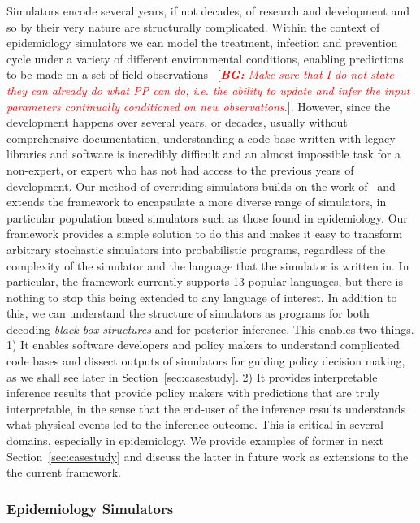 \documentclass{article}
\newcommand{\bg}[1]{~{{[{\it \textcolor{red}{{\bf BG:} #1}}]}}}
\begin{document}
Simulators encode several years, if not decades, of research and development and so by their very nature are structurally complicated. 
Within the context of epidemiology simulators we can model the treatment, infection and prevention cycle under a variety of different environmental conditions, enabling predictions to be made on a set of field observations \bg{Make sure that I do not state they can already do what PP can do, i.e. the ability to update and infer the input parameters continually conditioned on new observations.}.
However, since the development happens over several years, or decades, usually without comprehensive documentation, understanding a code base written with legacy libraries and software is incredibly difficult and an almost impossible task for a non-expert, or expert who has not had access to the previous years of development. 
Our method of overriding simulators builds on the work of~\cite{baydin2018efficient} and extends the framework to encapsulate a more diverse range of simulators, in particular population based simulators such as those found in epidemiology.
Our framework provides a simple solution to do this and makes it easy to transform arbitrary stochastic simulators into probabilistic programs, regardless of the complexity of the simulator and the language that the simulator is written in. 
In particular, the framework currently supports 13 popular languages, but there is nothing to stop this being extended to any language of interest. 
In addition to this, we can understand the structure of simulators as programs for both decoding \emph{black-box structures} and for posterior inference. This enables two things. 
1) It enables software developers and policy makers to understand complicated code bases and dissect outputs of simulators for guiding policy decision making, as we shall see later in Section~\ref{sec:casestudy}.
 2) It provides interpretable inference results that provide policy makers with predictions that are truly interpretable, in the sense that the end-user of the inference results understands what physical events led to the inference outcome. 
 This is critical in several domains, especially in epidemiology. 
 We provide examples of former in next Section~\ref{sec:casestudy} and discuss the latter in future work as extensions to the the current framework.


 \subsubsection*{Epidemiology Simulators}
\end{document}
